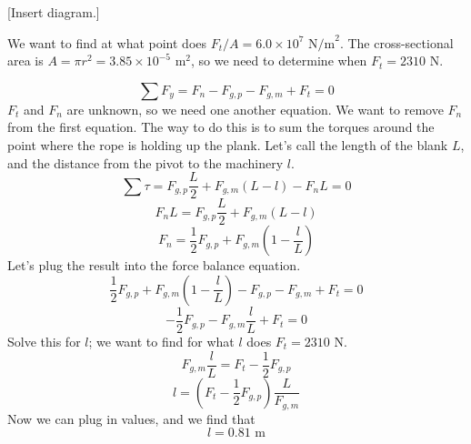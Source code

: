 [Insert diagram.]
\vspace{5cm}

We want to find at what point does $F_t/A=6.0\times 10^7\mbox{ N/m}^2$. The cross-sectional area is $A=\pi r^2=3.85\times 10^{-5}\mbox{ m}^2$, so we need to determine when $F_t=2310\mbox{ N}$.

$$\sum F_y=F_n-F_{g,p}-F_{g,m}+F_t=0$$
$F_t$ and $F_n$ are unknown, so we need one another equation. We want to remove $F_n$ from the first equation. The way to do this is to sum the torques around the point where the rope is holding up the plank. Let's call the length of the blank $L$, and the distance from the pivot to the machinery $l$.
$$\sum \tau=F_{g,p}\frac{L}{2}+F_{g,m}(L-l)-F_nL=0$$
$$F_nL=F_{g,p}\frac{L}{2}+F_{g,m}(L-l)$$
$$F_n=\frac{1}{2}F_{g,p}+F_{g,m}\left(1-\frac{l}{L}\right)$$
Let's plug the result into the force balance equation.
$$\frac{1}{2}F_{g,p}+F_{g,m}\left(1-\frac{l}{L}\right)-F_{g,p}-F_{g,m}+F_t=0$$
$$-\frac{1}{2}F_{g,p}-F_{g,m}\frac{l}{L}+F_t=0$$
Solve this for $l$; we want to find for what $l$ does $F_t=2310\mbox{ N}$.
$$F_{g,m}\frac{l}{L}=F_t-\frac{1}{2}F_{g,p}$$
$$l=\left(F_t-\frac{1}{2}F_{g,p}\right)\frac{L}{F_{g,m}}$$
Now we can plug in values, and we find that
$$\boxed{l=0.81\mbox{ m}}$$

\clearpage
